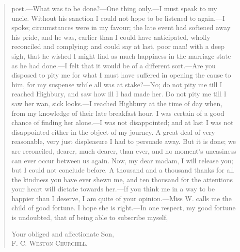 \begin{quotation}
post.—What was to be done?—One thing only.—I must speak to my uncle. Without his sanction I could not hope to be listened to again.—I spoke; circumstances were in my favour; the late event had softened away his pride, and he was, earlier than I could have anticipated, wholly reconciled and complying; and could say at last, poor man! with a deep sigh, that he wished I might find as much happiness in the marriage state as he had done.—I felt that it would be of a different sort.—Are you disposed to pity me for what I must have suffered in opening the cause to him, for my suspense while all was at stake?—No; do not pity me till I reached Highbury, and saw how ill I had made her. Do not pity me till I saw her wan, sick looks.—I reached Highbury at the time of day when, from my knowledge of their late breakfast hour, I was certain of a good chance of finding her alone.—I was not disappointed; and at last I was not disappointed either in the object of my journey. A great deal of very reasonable, very just displeasure I had to persuade away. But it is done; we are reconciled, dearer, much dearer, than ever, and no moment's uneasiness can ever occur between us again. Now, my dear madam, I will release you; but I could not conclude before. A thousand and a thousand thanks for all the kindness you have ever shewn me, and ten thousand for the attentions your heart will dictate towards her.—If you think me in a way to be happier than I deserve, I am quite of your opinion.—Miss W. calls me the child of good fortune. I hope she is right.—In one respect, my good fortune is undoubted, that of being able to subscribe myself,

\begin{flushright}
Your obliged and affectionate Son,\\
\textsc{F. C. Weston Churchill.}
\end{flushright}
\end{quotation}